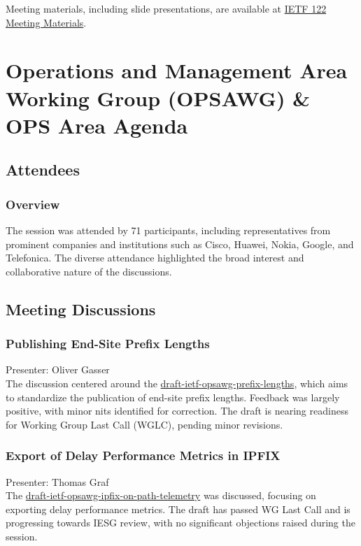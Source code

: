 \documentclass{article}
\begin{document}
Meeting materials, including slide presentations, are available at \href{https://meetings.conf.meetecho.com/ietf122/?session=34014}{IETF 122 Meeting Materials}.




\newpage

\section{Operations and Management Area Working Group (OPSAWG) \& OPS Area Agenda}

\subsection{Attendees}
\subsubsection{Overview}
The session was attended by 71 participants, including representatives from prominent companies and institutions such as Cisco, Huawei, Nokia, Google, and Telefonica. The diverse attendance highlighted the broad interest and collaborative nature of the discussions.

\subsection{Meeting Discussions}

\subsubsection{Publishing End-Site Prefix Lengths}
Presenter: Oliver Gasser \\
The discussion centered around the \href{https://datatracker.ietf.org/doc/html/draft-ietf-opsawg-prefix-lengths}{draft-ietf-opsawg-prefix-lengths}, which aims to standardize the publication of end-site prefix lengths. Feedback was largely positive, with minor nits identified for correction. The draft is nearing readiness for Working Group Last Call (WGLC), pending minor revisions.

\subsubsection{Export of Delay Performance Metrics in IPFIX}
Presenter: Thomas Graf \\
The \href{https://datatracker.ietf.org/doc/html/draft-ietf-opsawg-ipfix-on-path-telemetry}{draft-ietf-opsawg-ipfix-on-path-telemetry} was discussed, focusing on exporting delay performance metrics. The draft has passed WG Last Call and is progressing towards IESG review, with no significant objections raised during the session.
\end{document}
